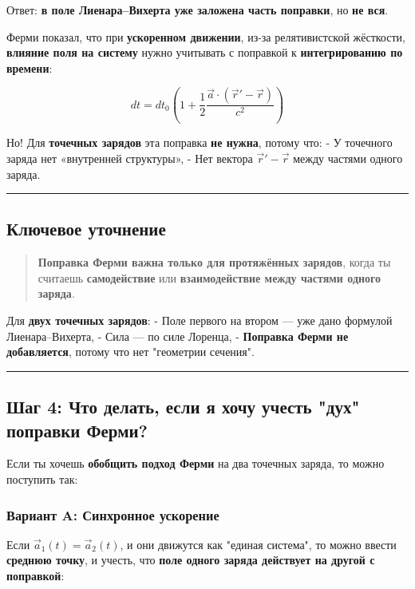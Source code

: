 \documentclass[11pt]{article}
\begin{document}
 Ответ: \textbf{в поле Лиенара--Вихерта уже заложена часть поправки},
но \textbf{не вся}.

Ферми показал, что при \textbf{ускоренном движении}, из-за
релятивистской жёсткости, \textbf{влияние поля на систему} нужно
учитывать с поправкой к \textbf{интегрированию по времени}:

\[
dt = dt_0 \left( 1 + \frac{1}{2} \frac{\vec{a} \cdot (\vec{r}' - \vec{r})}{c^2} \right)
\]

Но! Для \textbf{точечных зарядов} эта поправка \textbf{не нужна}, потому
что: - У точечного заряда нет «внутренней структуры», - Нет вектора
\(\vec{r}' - \vec{r}\) между частями одного заряда.

\begin{center}\rule{0.5\linewidth}{\linethickness}\end{center}

\subsection{ Ключевое уточнение}

\begin{quote}
\textbf{Поправка Ферми важна только для протяжённых зарядов}, когда ты
считаешь \textbf{самодействие} или \textbf{взаимодействие между частями
одного заряда}.
\end{quote}

Для \textbf{двух точечных зарядов}: - Поле первого на втором --- уже
дано формулой Лиенара--Вихерта, - Сила --- по силе Лоренца, -
\textbf{Поправка Ферми не добавляется}, потому что нет "геометрии
сечения".

\begin{center}\rule{0.5\linewidth}{\linethickness}\end{center}

\subsection{ Шаг 4: Что делать, если я хочу учесть "дух" поправки Ферми?}

Если ты хочешь \textbf{обобщить подход Ферми} на два точечных заряда, то
можно поступить так:

\subsubsection{Вариант A: Синхронное ускорение}

Если \(\vec{a}_1(t) = \vec{a}_2(t)\), и они движутся как "единая
система", то можно ввести \textbf{среднюю точку}, и учесть, что
\textbf{поле одного заряда действует на другой с поправкой}:
\end{document}
